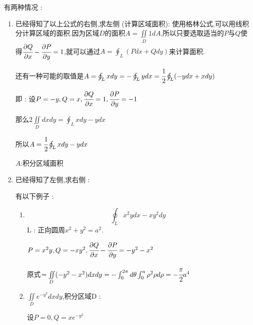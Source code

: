 \documentclass[UTF8,12pt]{ctexbook}
\newcommand{\definiteIntegral}[2]{\int^{#1}_{#2}}
\newcommand{\partialDerivativeFrac}[2]{\cfrac{\partial #1}{\partial #2}}
\newcommand{\doubleIntegralOnZone}[1]{\iint\limits_{#1}}
\newcommand{\curveIntegralOnLine}[1]{\oint_{#1}}
\begin{document}
{{{{      有两种情况 :
      \begin{enumerate}
        \item {
              已经得知了以上公式的右侧,求左侧 (计算区域面积):
              使用格林公式,可以用线积分计算区域的面积.因为区域$D$的面积$A = \doubleIntegralOnZone{D}1dA$,所以只要选取适当的$P$与$Q$使得$\partialDerivativeFrac{Q}{x} - \partialDerivativeFrac{P}{y} = 1$,就可以通过$A = \curveIntegralOnLine{L}(Pdx + Qdy)$来计算面积.

              还有一种可能的取值是$A = \curveIntegralOnLine{L}xdy = -\curveIntegralOnLine{L}ydx = \cfrac{1}{2}\curveIntegralOnLine{L}(-ydx + xdy)$

              即 : 设$P = -y,Q = x,\partialDerivativeFrac{Q}{x} = 1,\partialDerivativeFrac{P}{y} = -1$

              那么$2\doubleIntegralOnZone{D}dxdy = \curveIntegralOnLine{L}xdy - ydx$

              所以$A = \cfrac{1}{2}\curveIntegralOnLine{L}xdy - ydx$

              $A$:积分区域面积
              }
        \item {
              已经得知了左侧,求右侧 :

              有以下例子 :
              \begin{enumerate}
                \item {
                      $$
                        \curveIntegralOnLine{L}x^2ydx - xy^2dy
                      $$
                      L : 正向圆周$x^2 + y^2 = a^2$.

                      $P = x^2y,Q =-xy^2,\partialDerivativeFrac{Q}{x} - \partialDerivativeFrac{P}{y} = -y^2-x^2$

                      原式$=\doubleIntegralOnZone{D}(-y^2-x^2)dxdy = -\definiteIntegral{2\pi}{0}d\theta\definiteIntegral{a}{0}\rho^2\rho d\rho = -\cfrac{\pi}{2}a^4$
                      }
                \item {
                      $\doubleIntegralOnZone{D}e^{-y^2}dxdy$,积分区域D : 

                      设$P = 0,Q = xe^{-y^2}$

}
\end{enumerate}}
\end{enumerate}}}}}
\end{document}
